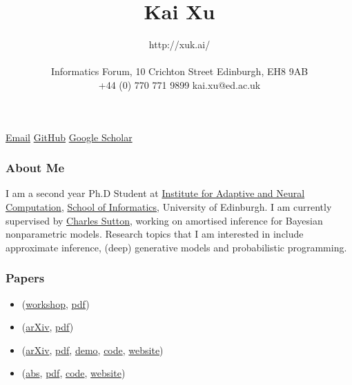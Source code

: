 \documentclass[11pt, a4paper]{article}
\title{Kai Xu} %
\date{} %
\author{http://xuk.ai/\\\\
Informatics Forum, 10 Crichton Street \textbar{} Edinburgh, EH8 9AB\\ %
+44 (0) 770 771 9899 \textbar{} kai.xu@ed.ac.uk } %
\providecommand{\tightlist}{%
  \setlength{\itemsep}{0pt}\setlength{\parskip}{0pt}}
\begin{document}

\maketitle
\begin{raggedright}
\href{mailto:kai.xu@ed.ac.uk}{Email} \textbar{}
\href{http://github.com/xukai92}{GitHub} \textbar{}
\href{https://scholar.google.ca/citations?user=kf3C60wAAAAJ}{Google
Scholar}

\subsubsection{About Me}

I am a second year Ph.D Student at
\href{http://www.anc.ed.ac.uk/}{Institute for Adaptive and Neural
Computation}, \href{https://www.ed.ac.uk/informatics}{School of
Informatics}, University of Edinburgh. I am currently supervised by
\href{http://homepages.inf.ed.ac.uk/csutton/}{Charles Sutton}, working
on amortised inference for Bayesian nonparametric models. Research
topics that I am interested in include approximate inference, (deep)
generative models and probabilistic programming.

\subsubsection{Papers}

\begin{itemize}
\tightlist
\item
  (\href{https://sites.google.com/view/nipsbnp2018/accepted-papers}{workshop},
  \href{https://drive.google.com/file/d/1x-p13HC0SNTWcWcL_AspBS4OUBEGqn-a/view}{pdf})
\item
  (\href{https://arxiv.org/abs/1806.00101}{arXiv},
  \href{https://arxiv.org/pdf/1806.00101.pdf}{pdf})
\item
  (\href{https://arxiv.org/abs/1803.04042}{arXiv},
  \href{https://arxiv.org/pdf/1803.04042.pdf}{pdf},
  \href{http://xuk.ai/darksight/demo/mnist.html}{demo},
  \href{https://github.com/xukai92/darksight}{code},
  \href{http://xuk.ai/darksight/}{website})
\item
  (\href{http://proceedings.mlr.press/v84/ge18b.html}{abs},
  \href{http://proceedings.mlr.press/v84/ge18b/ge18b.pdf}{pdf},
  \href{https://github.com/yebai/Turing.jl}{code},
  \href{http://turing.guru/}{website})
\end{itemize}


\end{raggedright}
\end{document}
